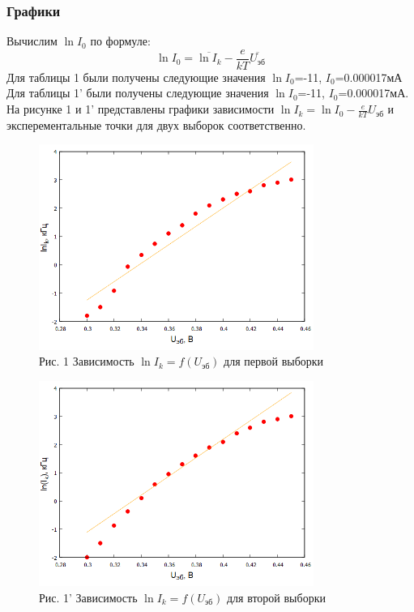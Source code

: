 \subsubsection{Графики}
Вычислим $\ln I_0$ по формуле:
\begin{equation}
    \ln I_0=\overline{\ln I_k}-\frac{e}{kT}\overline{U_{\text{эб}}}
\end{equation}
Для таблицы 1 были получены следующие значения $\ln I_0$=-11, $I_0$=0.000017мА
Для таблицы 1' были получены следующие значения $\ln I_0$=-11, $I_0$=0.000017мА.
На рисунке 1 и 1' представлены графики зависимости $\ln I_k=\ln I_0-\frac{e}{kT}U_{\text{эб}}$ и эксперементальные точки для двух выборок соответственно. 
\begin{figure}[H]
\centering
\includegraphics[width=0.8\textwidth]{График 1.png}
\caption*{Рис. 1 Зависимость $\ln I_k=f(U_{\text{эб}})$ для первой выборки }
\label{fig:gist}
\end{figure}
\begin{figure}[H]
\centering
\includegraphics[width=0.8\textwidth]{График 2.png}
\caption*{Рис. 1' Зависимость $\ln I_k=f(U_{\text{эб}})$ для второй выборки}
\label{fig:gist}
\end{figure}
